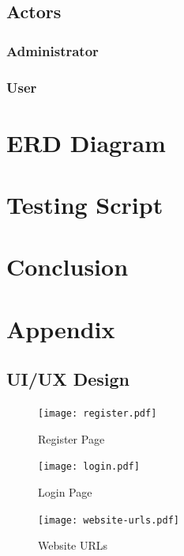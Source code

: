 \documentclass{scrartcl}
\begin{document}
\subsection{Actors}

\subsubsection{Administrator}

\subsubsection{User}

\section{ERD Diagram}

\section{Testing Script}

\section{Conclusion}

\newpage






\appendix
\section{Appendix}

\subsection{UI/UX Design}

\begin{figure}[H]
  \centering
  \texttt{[image: register.pdf]}
  \caption{Register Page}
\end{figure}

\begin{figure}[H]
  \centering
  \texttt{[image: login.pdf]}
  \caption{Login Page}
\end{figure}

\begin{figure}[H]
  \centering
  \texttt{[image: website-urls.pdf]}
  \caption{Website URLs}
\end{figure}
\end{document}
